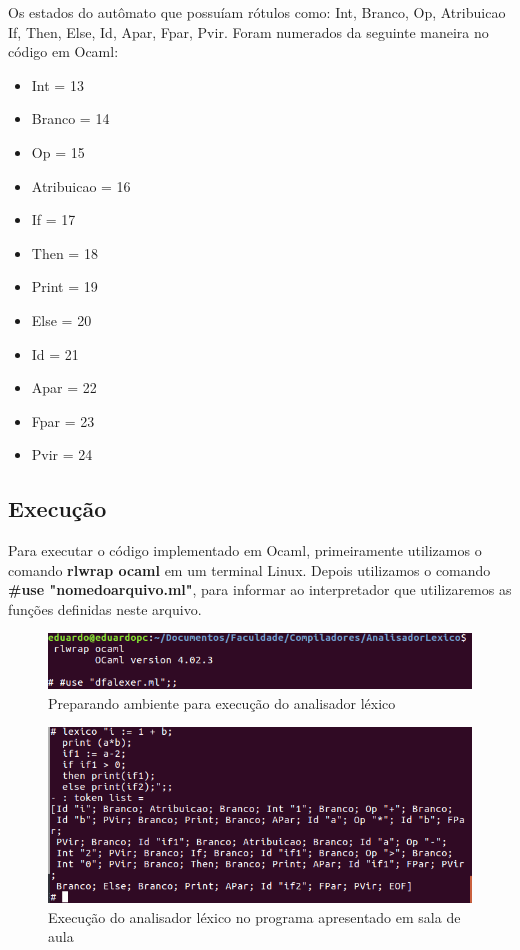 \documentclass[hidelinks,12pt]{article}
\begin{document}
	Os estados do autômato que possuíam rótulos como: Int, Branco, Op, Atribuicao If, Then, Else, Id, Apar, Fpar, Pvir. Foram numerados da seguinte maneira no código em Ocaml:
	\begin{itemize}
	\item Int = 13
	\item Branco = 14
	\item Op = 15
	\item Atribuicao = 16
	\item If = 17
	\item Then = 18
	\item Print = 19
	\item Else = 20
	\item Id = 21
	\item Apar = 22
	\item Fpar = 23
	\item Pvir = 24
	\end{itemize}

\subsection{Execução}

	Para executar o código implementado em Ocaml, primeiramente utilizamos o comando \textbf{rlwrap ocaml} em um terminal Linux. Depois utilizamos o comando \textbf{\#use "nomedoarquivo.ml"}, para informar ao interpretador que utilizaremos as funções definidas neste arquivo.
	
	\begin{figure}[h!]
		\centering
		\includegraphics[scale=0.5]{Figures/rlwrap}
		\caption{Preparando ambiente para execução do analisador léxico}
	\end{figure}
	
	\begin{figure}[h!]
		\centering
		\includegraphics[scale=0.5]{Figures/Analiselexica}
		\caption{Execução do analisador léxico no programa apresentado em sala de aula}
	\end{figure}
	
\end{document}
